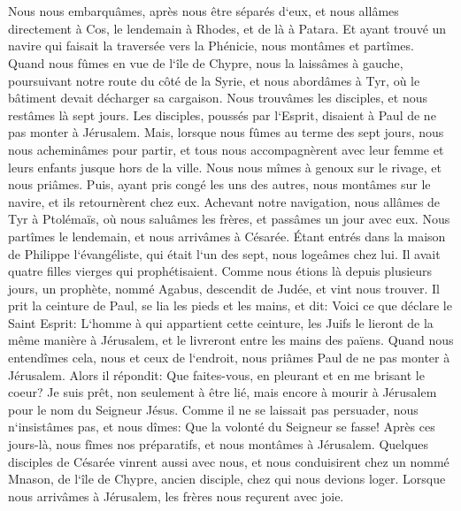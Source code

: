 \chapter{}

\verse Nous nous embarquâmes, après nous être séparés d`eux, et nous allâmes directement à Cos, le lendemain à Rhodes, et de là à Patara. 
\verse Et ayant trouvé un navire qui faisait la traversée vers la Phénicie, nous montâmes et partîmes. 
\verse Quand nous fûmes en vue de l`île de Chypre, nous la laissâmes à gauche, poursuivant notre route du côté de la Syrie, et nous abordâmes à Tyr, où le bâtiment devait décharger sa cargaison. 
\verse Nous trouvâmes les disciples, et nous restâmes là sept jours. Les disciples, poussés par l`Esprit, disaient à Paul de ne pas monter à Jérusalem. 
\verse Mais, lorsque nous fûmes au terme des sept jours, nous nous acheminâmes pour partir, et tous nous accompagnèrent avec leur femme et leurs enfants jusque hors de la ville. Nous nous mîmes à genoux sur le rivage, et nous priâmes. 
\verse Puis, ayant pris congé les uns des autres, nous montâmes sur le navire, et ils retournèrent chez eux. 
\verse Achevant notre navigation, nous allâmes de Tyr à Ptolémaïs, où nous saluâmes les frères, et passâmes un jour avec eux. 
\verse Nous partîmes le lendemain, et nous arrivâmes à Césarée. Étant entrés dans la maison de Philippe l`évangéliste, qui était l`un des sept, nous logeâmes chez lui. 
\verse Il avait quatre filles vierges qui prophétisaient. 
\verse Comme nous étions là depuis plusieurs jours, un prophète, nommé Agabus, descendit de Judée, 
\verse et vint nous trouver. Il prit la ceinture de Paul, se lia les pieds et les mains, et dit: Voici ce que déclare le Saint Esprit: L`homme à qui appartient cette ceinture, les Juifs le lieront de la même manière à Jérusalem, et le livreront entre les mains des païens. 
\verse Quand nous entendîmes cela, nous et ceux de l`endroit, nous priâmes Paul de ne pas monter à Jérusalem. 
\verse Alors il répondit: Que faites-vous, en pleurant et en me brisant le coeur? Je suis prêt, non seulement à être lié, mais encore à mourir à Jérusalem pour le nom du Seigneur Jésus. 
\verse Comme il ne se laissait pas persuader, nous n`insistâmes pas, et nous dîmes: Que la volonté du Seigneur se fasse! 
\verse Après ces jours-là, nous fîmes nos préparatifs, et nous montâmes à Jérusalem. 
\verse Quelques disciples de Césarée vinrent aussi avec nous, et nous conduisirent chez un nommé Mnason, de l`île de Chypre, ancien disciple, chez qui nous devions loger. 
\verse Lorsque nous arrivâmes à Jérusalem, les frères nous reçurent avec joie. 
